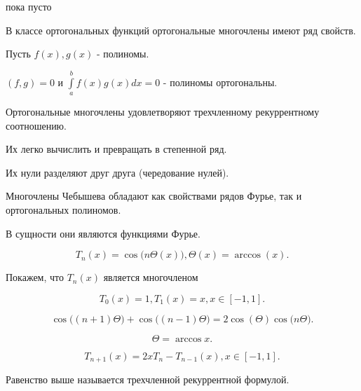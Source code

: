 \begin{col-answer-preambule}
	\begin{plan}
    \item пока пусто
	\end{plan}
\end{col-answer-preambule}


В классе ортогональных функций ортогональные многочлены имеют ряд свойств.

Пусть $f(x), g(x)$ - полиномы.

$(f, g) = 0$ и $\int\limits_a^b f(x) g(x) dx = 0$ - полиномы ортогональны.

\begin{characteristics_}
  \item Ортогональные многочлены удовлетворяют трехчленному рекуррентному соотношению.
  \item Их легко вычислить и превращать в степенной ряд.
  \item Их нули разделяют друг друга (чередование нулей).
\end{characteristics_}

Многочлены Чебышева обладают как свойствами рядов Фурье, так и ортогональных полиномов.

В сущности они являются функциями Фурье.

\begin{equation*}
  T_n(x) = \cos \Big(n \Theta(x)\Big), \Theta(x) = \arccos(x).
\end{equation*}

Покажем, что $T_n(x)$ является многочленом

\begin{equation}\label{eq:cheb_2}
  T_0(x) = 1, T_1(x) = x, x \in [-1, 1].
\end{equation}

\begin{equation*}
  \cos \Big((n+1) \Theta\Big) + \cos \Big((n-1) \Theta\Big) = 2 \cos (\Theta) \cos \Big(n \Theta\Big).
\end{equation*}

\begin{equation*}
  \Theta = \arccos x.
\end{equation*}

\begin{equation}\label{eq:cheb_4}
  T_{n+1}(x) = 2x T_n - T_{n-1}(x), x \in [-1, 1].
\end{equation}

Равенство выше называется трехчленной рекуррентной формулой.

